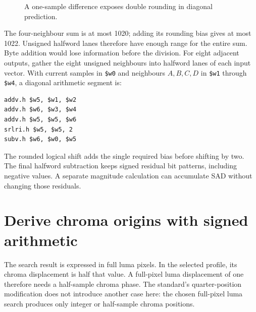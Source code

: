 \begin{figure}[htbp]
\centering
{}
\caption{A one-sample difference exposes double rounding in diagonal prediction.}
\end{figure}

The four-neighbour sum is at most 1020; adding its rounding bias gives at most
1022. Unsigned halfword lanes therefore have enough range for the entire sum.
Byte addition would lose information before the division. For eight adjacent
outputs, gather the eight unsigned neighbours into halfword lanes of each input
vector. With current samples in \texttt{\$w0} and neighbours $A,B,C,D$ in
\texttt{\$w1} through \texttt{\$w4}, a diagonal arithmetic segment is:
\begin{verbatim}
addv.h $w5, $w1, $w2
addv.h $w6, $w3, $w4
addv.h $w5, $w5, $w6
srlri.h $w5, $w5, 2
subv.h $w6, $w0, $w5
\end{verbatim}
The rounded logical shift adds the single required bias before shifting by two.
The final halfword subtraction keeps signed residual bit patterns, including
negative values. A separate magnitude calculation can accumulate SAD without
changing those residuals.

\section{Derive chroma origins with signed arithmetic}
The search result is expressed in full luma pixels. In the selected profile,
its chroma displacement is half that value. A full-pixel luma displacement of
one therefore needs a half-sample chroma phase. The standard's quarter-position
modification does not introduce another case here: the chosen full-pixel luma
search produces only integer or half-sample chroma positions.

